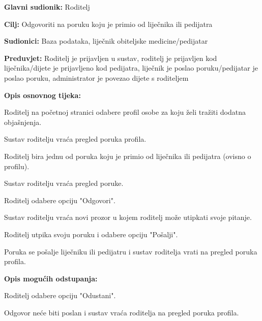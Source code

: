 				
					
					\noindent {}
					\begin{packed_item}
						
						\item \textbf{Glavni sudionik: }Roditelj
						\item  \textbf{Cilj:} Odgovoriti na poruku koju je primio od liječnika ili pedijatra
						\item  \textbf{Sudionici:} Baza podataka, liječnik obiteljske medicine/pedijatar
						\item  \textbf{Preduvjet:} Roditelj je prijavljen u sustav, roditelj je prijavljen kod liječnika/dijete je prijavljeno kod pedijatra, liječnik je poslao poruku/pedijatar je poslao poruku, administrator je povezao dijete s roditeljem
						\item  \textbf{Opis osnovnog tijeka:}
						
						\item[] \begin{packed_enum}
							
							\item Roditelj na početnoj stranici odabere profil osobe za koju želi tražiti dodatna objašnjenja.
							\item Sustav roditelju vraća pregled poruka profila.
							\item Roditelj bira jednu od poruka koju je primio od liječnika ili pedijatra (ovisno o profilu).
							\item Sustav roditelju vraća pregled poruke.
							\item Roditelj odabere opciju "Odgovori".
							\item Sustav roditelju vraća novi prozor u kojem roditelj može utipkati svoje pitanje.
							\item Roditelj utpika svoju poruku i odabere opciju "Pošalji".
							\item Poruka se pošalje liječniku ili pedijatru i sustav roditelja vrati na pregled poruka profila.
						\end{packed_enum}
						
						\item  \textbf{Opis mogućih odstupanja:}
						
						\item[] \begin{packed_item}
							
							\item[7.a] Roditelj odabere opciju "Odustani".
							\item[] \begin{packed_enum}
								
								\item Odgovor neće biti poslan i sustav vraća roditelja na pregled poruka profila.
							\end{packed_enum}
							
							
						\end{packed_item}
						
						
					\end{packed_item}
					
